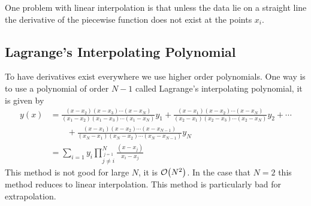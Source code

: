 \documentclass[a4paper]{article}
\begin{document}
    One problem with linear interpolation is that unless the data lie on a straight line the derivative of the piecewise function does not exist at the points \(x_i\).
    
    \subsection{Lagrange's Interpolating Polynomial}
    To have derivatives exist everywhere we use higher order polynomials.
    One way is to use a polynomial of order \(N - 1\) called Lagrange's interpolating polynomial, it is given by
    \begin{align*}
        y(x) &= \frac{(x - x_2)(x - x_3)\dotsm(x - x_N)}{(x_1 - x_2)(x_1 - x_3)\dotsm(x_1 - x_N)}y_1 + \frac{(x - x_1)(x - x_2)\dotsm(x - x_N)}{(x_2 - x_1)(x_2 - x_3)\dotsm(x_2 - x_N)}y_2 + \dotsb \\&\qquad+ \frac{(x - x_1)(x - x_2)\dotsm(x - x_{N-1})}{(x_N - x_1)(x_N - x_2)\dotsm(x_N - x_{N-1})}y_N\\
        &= \sum_{i=1} y_i \prod_{\stackrel{j=1}{j\ne i}}^{N} \frac{(x - x_j)}{x_i - x_j}
    \end{align*}
    This method is not good for large \(N\), it is \(\order{N^2}\).
    In the case that \(N = 2\) this method reduces to linear interpolation.
    This method is particularly bad for extrapolation.
    
\end{document}
